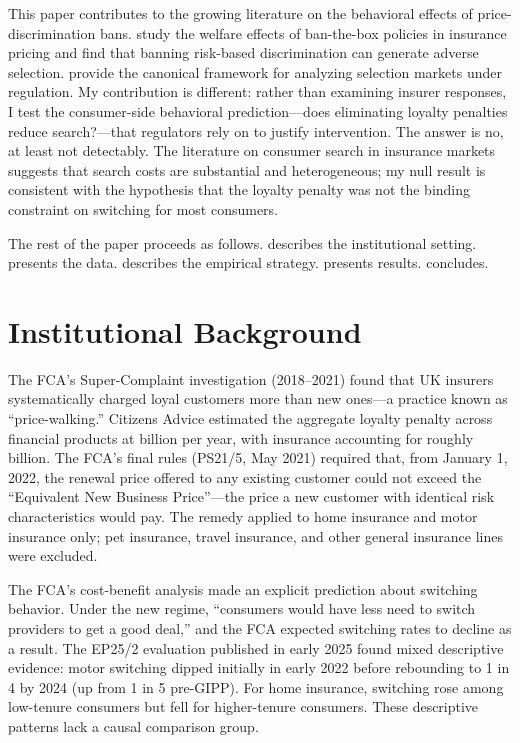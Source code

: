 \documentclass[12pt]{article}
\begin{document}
This paper contributes to the growing literature on the behavioral effects of price-discrimination bans. \citet{cuesta2024price} study the welfare effects of ban-the-box policies in insurance pricing and find that banning risk-based discrimination can generate adverse selection. \citet{einav2010selection} provide the canonical framework for analyzing selection markets under regulation. My contribution is different: rather than examining insurer responses, I test the consumer-side behavioral prediction---does eliminating loyalty penalties reduce search?---that regulators rely on to justify intervention. The answer is no, at least not detectably. The literature on consumer search in insurance markets \citep{honka2014quantifying, allen2019search} suggests that search costs are substantial and heterogeneous; my null result is consistent with the hypothesis that the loyalty penalty was not the binding constraint on switching for most consumers.

The rest of the paper proceeds as follows.  describes the institutional setting.  presents the data.  describes the empirical strategy.  presents results.  concludes.

\section{Institutional Background}
\label{sec:background}

The FCA's Super-Complaint investigation (2018--2021) found that UK insurers systematically charged loyal customers more than new ones---a practice known as ``price-walking.'' Citizens Advice estimated the aggregate loyalty penalty across financial products at  billion per year, with insurance accounting for roughly  billion. The FCA's final rules (PS21/5, May 2021) required that, from January 1, 2022, the renewal price offered to any existing customer could not exceed the ``Equivalent New Business Price''---the price a new customer with identical risk characteristics would pay. The remedy applied to home insurance and motor insurance only; pet insurance, travel insurance, and other general insurance lines were excluded.

The FCA's cost-benefit analysis made an explicit prediction about switching behavior. Under the new regime, ``consumers would have less need to switch providers to get a good deal,'' and the FCA expected switching rates to decline as a result. The EP25/2 evaluation published in early 2025 found mixed descriptive evidence: motor switching dipped initially in early 2022 before rebounding to 1 in 4 by 2024 (up from 1 in 5 pre-GIPP). For home insurance, switching rose among low-tenure consumers but fell for higher-tenure consumers. These descriptive patterns lack a causal comparison group.
\end{document}
